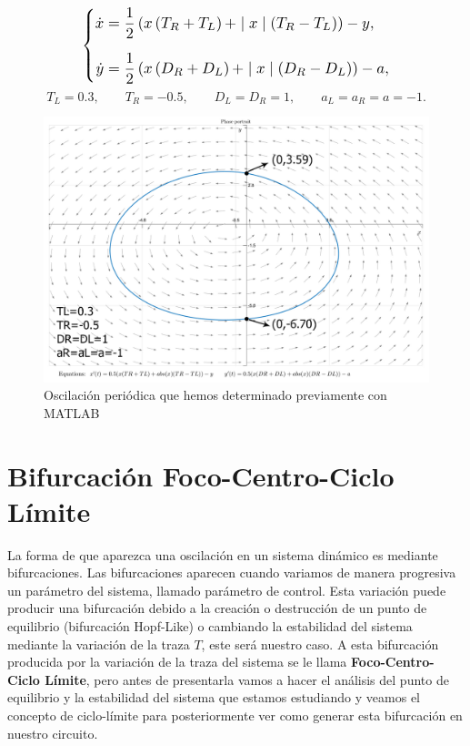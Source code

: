 \documentclass[12pt,a4paper]{report} %
\begin{document}
	\begin{equation}
		\label{eq:clejem}
		\scalebox{1.2}{$\displaystyle
			\left\{
			\begin{aligned}
			\dot{x}&=\frac{1}{2}\left( x\left(T_R+T_L\right)+\mid x\mid \left(T_R-T_L\right)\right)-y,
				 \\[2mm]
			\dot{y}&=\frac{1}{2}\left( x\left(D_R+D_L\right)+\mid x\mid \left(D_R-D_L\right)\right)-a,
			\end{aligned}
			\right. 
			$}
	\end{equation}\smallskip
	\begin{equation*}
		T_L=0.3, \qquad T_R=-0.5, \qquad D_L=D_R=1, \qquad a_L=a_R=a=-1.
	\end{equation*}\smallskip
	
	\begin{figure}[h]
		\centering
		\includegraphics[width=1\textwidth]{clejemplo.jpg}
		\caption{Oscilación periódica que hemos determinado previamente con MATLAB}
		\label{fig:clejemplo}
	\end{figure}\smallskip
	
	\newpage
	
	\chapter{Bifurcación Foco-Centro-Ciclo Límite}
	La forma de que aparezca una oscilación en un sistema dinámico es mediante bifurcaciones. Las bifurcaciones aparecen cuando variamos de manera progresiva un parámetro del sistema, llamado parámetro de control. Esta variación puede producir una bifurcación debido a la creación o destrucción de un punto de equilibrio (bifurcación Hopf-Like) o cambiando la estabilidad del sistema mediante la variación de la traza $T$, este será nuestro caso. A esta bifurcación producida por la variación de la traza del sistema se le llama \textbf{Foco-Centro-Ciclo Límite}, pero antes de presentarla vamos a hacer el análisis del punto de equilibrio y la estabilidad del sistema que estamos estudiando y veamos el concepto de ciclo-límite para posteriormente ver como generar esta bifurcación en nuestro circuito.
	
\end{document}
